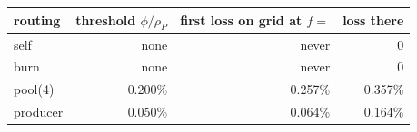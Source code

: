 \begin{tabular}{|l|r|r|r|}
\hline
\rowcolor{gray!15}routing & threshold $\phi/\rho_P$ & first loss on grid at $f=$ & loss there \\
\hline
self & none & never & 0 \\
\hline
burn & none & never & 0 \\
\hline
pool(4) & 0.200\% & 0.257\% & 0.357\% \\
\hline
producer & 0.050\% & 0.064\% & 0.164\% \\
\hline
\end{tabular}
